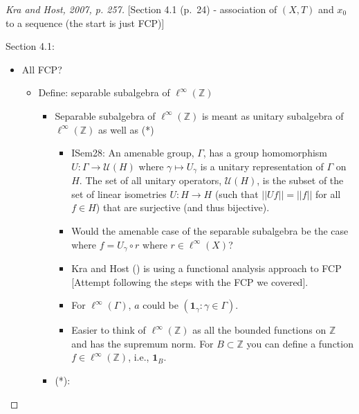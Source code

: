 \documentclass[
  british,
]{article}
\providecommand{\tightlist}{%
  \setlength{\itemsep}{0pt}\setlength{\parskip}{0pt}}
\theoremstyle{plain}
\theoremstyle{definition}
\theoremstyle{plain}
\theoremstyle{remark}
\newcommand{\AmenableGroup}{{\Gamma}}
\newcommand{\AmenableGroupElement}{{\gamma}}
\begin{document}
\begin{proof}[{Kra and Host, 2007, p. 257}]
{[}Section 4.1 (p.~24) - association of \((X,T)\) and \(x_0\) to a
sequence (the start is just FCP){]}

Section 4.1:

\begin{itemize}
\tightlist
\item
  All FCP?

  \begin{itemize}
  \tightlist
  \item
    Define: separable subalgebra of \(\ell^\infty(\mathbb{Z})\)

    \begin{itemize}
    \tightlist
    \item
      Separable subalgebra of \(\ell^\infty(\mathbb{Z})\) is meant as
      unitary subalgebra of \(\ell^\infty(\mathbb{Z})\) as well as (*)

      \begin{itemize}
      \tightlist
      \item
        ISem28: An amenable group, \(\AmenableGroup\), has a group
        homomorphism \(U:\AmenableGroup\rightarrow\mathscr{U}(H)\) where
        \(\AmenableGroupElement\mapsto U_\AmenableGroupElement\) is a
        unitary representation of \(\Gamma\) on \(H\). The set of all
        unitary operators, \(\mathscr{U}(H)\), is the subset of the set
        of linear isometries \(U:H\rightarrow H\) (such that
        \(||Uf||=||f||\) for all \(f\in H\)) that are surjective (and
        thus bijective).
      \item
        Would the amenable case of the separable subalgebra be the case
        where \(f=U_\gamma\circ r\) where \(r\in\ell^\infty(X)\)?
      \item
        Kra and Host () is using a
        functional analysis approach to FCP {[}Attempt following the
        steps with the FCP we covered{]}.
      \item
        For \(\ell^\infty(\AmenableGroup)\), \(a\) could be
        \((\boldsymbol{1}_\AmenableGroupElement:\AmenableGroupElement\in \AmenableGroup)\).
      \item
        Easier to think of \(\ell^\infty(\mathbb{Z})\) as all the
        bounded functions on \(\mathbb{Z}\) and has the supremum norm.
        For \(B\subset\mathbb{Z}\) you can define a function
        \(f\in\ell^\infty(\mathbb{Z})\), i.e., \(\boldsymbol{1}_B\).
      \end{itemize}
    \item
      (*):


\end{itemize}
\end{itemize}
\end{itemize}
\end{proof}
\end{document}
